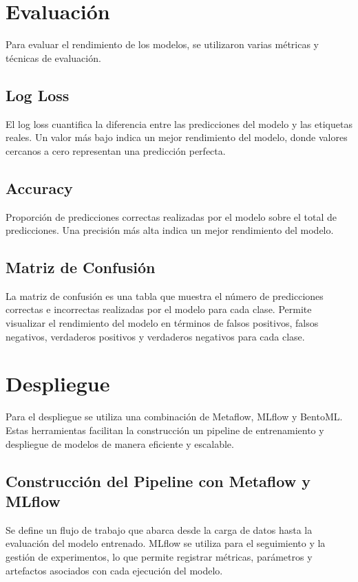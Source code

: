\documentclass[11pt,a4paper]{report}
\begin{document}
\chapter*{Evaluación}

Para evaluar el rendimiento de los modelos, se utilizaron varias métricas y técnicas de evaluación.

\section*{Log Loss}
El log loss cuantifica la diferencia entre las predicciones del modelo y las etiquetas reales. Un valor más bajo indica un mejor rendimiento del modelo, donde valores cercanos a cero representan una predicción perfecta.

\section*{Accuracy}
Proporción de predicciones correctas realizadas por el modelo sobre el total de predicciones. Una precisión más alta indica un mejor rendimiento del modelo.

\section*{Matriz de Confusión}
La matriz de confusión es una tabla que muestra el número de predicciones correctas e incorrectas realizadas por el modelo para cada clase. Permite visualizar el rendimiento del modelo en términos de falsos positivos, falsos negativos, verdaderos positivos y verdaderos negativos para cada clase.


\chapter*{Despliegue}

Para el despliegue se utiliza una combinación de Metaflow, MLflow y BentoML. Estas herramientas facilitan la construcción un pipeline de entrenamiento y despliegue de modelos de manera eficiente y escalable.

\section*{Construcción del Pipeline con Metaflow y MLflow}
Se define un flujo de trabajo que abarca desde la carga de datos hasta la evaluación del modelo entrenado. MLflow se utiliza para el seguimiento y la gestión de experimentos, lo que permite registrar métricas, parámetros y artefactos asociados con cada ejecución del modelo.
\end{document}
